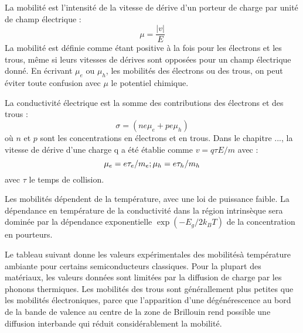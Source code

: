 La mobilité est l'intensité de la vitesse de dérive d'un porteur de charge par
unité de champ électrique :
\begin{equation}
    \mu = \frac{|v|}{E}
\end{equation}
La mobilité est définie comme étant positive à la fois pour les électrons et les
trous, même si leurs vitesses de dérives sont opposées pour un champ électrique
donné. En écrivant $\mu_e$ ou $\mu_h$, les mobilités des électrons ou des trous,
on peut éviter toute confusion avec $\mu$ le potentiel chimique.

La conductivité électrique est la somme des contributions des électrons et des
trous :
\begin{equation}
    \sigma = (ne\mu_e + pe\mu_h)
\end{equation}
où $n$ et $p$ sont les concentrations en électrons et en trous. Dans le chapitre
..., la vitesse de dérive d'une charge q a été établie comme $v = q\tau E/m$ avec
:
\begin{equation}
    \mu_e = e \tau_e / m_e ; \hfill \mu_h = e \tau_h / m_h
\end{equation}
avec $\tau$ le temps de collision.

Les mobilités dépendent de la température, avec une loi de puissance faible. La
dépendance en température de la conductivité dans la région intrinsèque sera
dominée par la dépendance exponentielle $\exp(-E_g/2k_BT)$ de la concentration en
pourteurs.

Le tableau suivant donne les valeurs expérimentales des mobilitésà température
ambiante pour certains semiconducteurs classiques. Pour la plupart des matériaux,
les valeurs données sont limitées par la diffusion de charge par les phonons
thermiques. Les mobilités des trous sont générallement plus petites que les
mobilités électroniques, parce que l'apparition d'une dégénérescence au bord de
la bande de valence au centre de la zone de Brillouin rend possible une diffusion
interbande qui réduit considérablement la mobilité.


